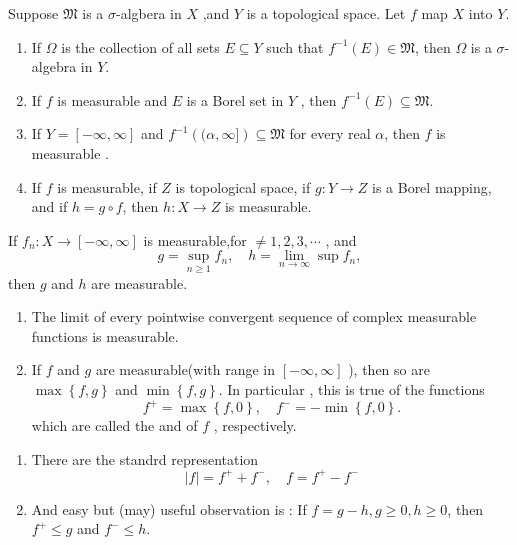 \documentclass[../main.tex]{subfiles}
\begin{document}
\begin{theorem}{}{}
    Suppose \(  \mathfrak{M}  \) is a \(   \sigma   \)-algbera in \(  X  \) ,and \(  Y  \) is a topological space. Let \(  f   \) map \(  X  \) into \(  Y  \).
    \begin{enumerate}
        \item If \(   \Omega   \) is the collection of all sets \(  E\subseteq Y  \) such that \(  f^{-1} \left( E \right)\in  \mathfrak{M}   \), then \(   \Omega   \) is a \(   \sigma   \)- algebra in \(  Y  \). 
        \item If \(  f  \) is measurable and \(  E  \) is a Borel set in \(  Y  \) , then \(  f^{-1} \left( E \right) \subseteq \mathfrak{M}   \). 
        \item If \(  Y= [-\infty,\infty]  \) and \(  f^{-1} \left( (\alpha ,\infty] \right)\subseteq  \mathfrak{M}   \) for every real \(  \alpha   \), then \(  f   \)  is measurable . 
        \item If \(  f  \) is measurable, if \(  Z  \) is topological space, if \(  g:Y\to Z  \) is a Borel mapping, and if \(  h= g\circ f  \), then \(  h:X\to Z  \) is measurable.                   
    \end{enumerate}
           
\end{theorem}


\begin{theorem}{}{}
    If \(  f_{n}:X\to [-\infty,\infty]  \) is measurable,for \(  \neq 1,2,3,\cdots   \) , and \[
    g =  \sup _{n\ge 1}f_{n},\quad h= \lim_{n\to \infty}\sup f_{n},
    \] then \(  g  \) and \(  h  \) are measurable.    
\end{theorem}

\begin{corollary}{}{}
    \begin{enumerate}
        \item The limit of every pointwise convergent sequence of complex measurable functions is measurable.
        \item If \(  f  \) and \(  g  \) are measurable(with range in \(  [-\infty,\infty]  \) ), then so are \(  \max \left\{ f,g \right\}  \) and \(  \min \left\{ f,g \right\}  \). In particular , this is true of the functions \[
        f^{+ }= \max \left\{ f,0 \right\},\quad f^{-}= -\min \left\{ f,0 \right\}.
        \]    which are called the  and  of \(  f  \) , respectively. 
    \end{enumerate}
    
\end{corollary}
\begin{remark}
   \begin{enumerate}
    \item  There are the standrd representation \[
    \left| f \right|= f^{+ }+ f^{-},\quad  f= f^{+ }-f^{-} 
    \]
    \item And easy but (may) useful observation is : If \(  f= g-h, g \ge 0, h \ge 0  \), then \(  f^{+ }\le g  \) and \(  f^{-} \le h  \).   
   \end{enumerate}
   
\end{remark}
\end{document}
